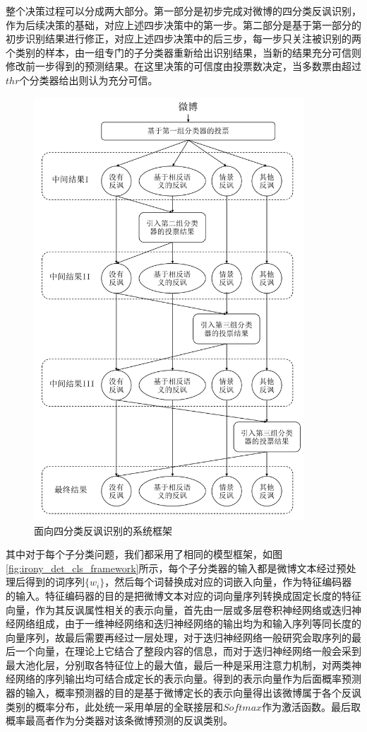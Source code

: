 整个决策过程可以分成两大部分。第一部分是初步完成对微博的四分类反讽识别，作为后续决策的基础，对应上述四步决策中的第一步。第二部分是基于第一部分的初步识别结果进行修正，对应上述四步决策中的后三步，每一步只关注被识别的两个类别的样本，由一组专门的子分类器重新给出识别结果，当新的结果充分可信则修改前一步得到的预测结果。在这里决策的可信度由投票数决定，当多数票由超过$thr$个分类器给出则认为充分可信。

\begin{figure}[H]
  \centering
  \includegraphics[width=0.9\textwidth]{img/irony_det_system.pdf}
  \caption{面向四分类反讽识别的系统框架}
  \label{fig:irony_det_system}
\end{figure}

其中对于每个子分类问题，我们都采用了相同的模型框架，如图\ref{fig:irony_det_cls_framework}所示，每个子分类器的输入都是微博文本经过预处理后得到的词序列$\{w_i\}$，然后每个词替换成对应的词嵌入向量，作为特征编码器的输入。特征编码器的目的是把微博文本对应的词向量序列转换成固定长度的特征向量，作为其反讽属性相关的表示向量，首先由一层或多层卷积神经网络或迭归神经网络组成，由于一维神经网络和迭归神经网络的输出均为和输入序列等同长度的向量序列，故最后需要再经过一层处理，对于迭归神经网络一般研究会取序列的最后一个向量，在理论上它结合了整段内容的信息，而对于迭归神经网络一般会采到最大池化层，分别取各特征位上的最大值，最后一种是采用注意力机制，对两类神经网络的序列输出均可结合成定长的表示向量。得到的表示向量作为后面概率预测器的输入，概率预测器的目的是基于微博定长的表示向量得出该微博属于各个反讽类别的概率分布，此处统一采用单层的全联接层和$Softmax$作为激活函数。最后取概率最高者作为分类器对该条微博预测的反讽类别。


